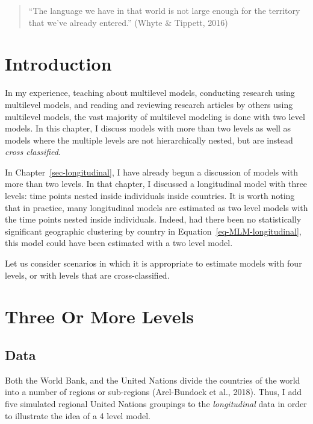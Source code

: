 \documentclass[
  letterpaper,
  DIV=11,
  numbers=noendperiod]{scrreprt}
\begin{document}
\begin{quote}
``The language we have in that world is not large enough for the
territory that we've already entered.'' (Whyte \& Tippett, 2016)
\end{quote}

\section{Introduction}\label{introduction-3}

In my experience, teaching about multilevel models, conducting research
using multilevel models, and reading and reviewing research articles by
others using multilevel models, the vast majority of multilevel modeling
is done with two level models. In this chapter, I discuss models with
more than two levels as well as models where the multiple levels are not
hierarchically nested, but are instead \emph{cross classified}.

In Chapter~\ref{sec-longitudinal}, I have already begun a discussion of
models with more than two levels. In that chapter, I discussed a
longitudinal model with three levels: time points nested inside
individuals inside countries. It is worth noting that in practice, many
longitudinal models are estimated as two level models with the time
points nested inside individuals. Indeed, had there been no
statistically significant geographic clustering by country in
Equation~\ref{eq-MLM-longitudinal}, this model could have been estimated
with a two level model.

Let us consider scenarios in which it is appropriate to estimate models
with four levels, or with levels that are cross-classified.

\section{Three Or More Levels}\label{sec-fourlevel}

\subsection{Data}\label{data}

Both the World Bank, and the United Nations divide the countries of the
world into a number of regions or sub-regions (Arel-Bundock et al.,
2018). Thus, I add five simulated regional United Nations groupings to
the \emph{longitudinal} data in order to illustrate the idea of a 4
level model.
\end{document}
